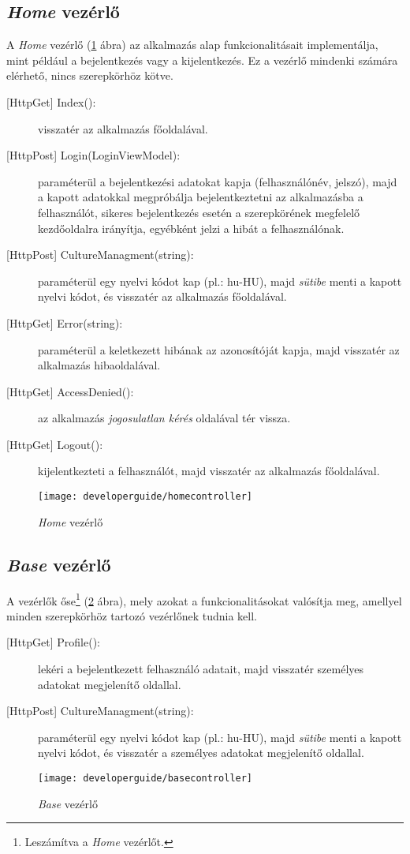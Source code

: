 \subsection{\emph{Home} vezérlő}
A \emph{Home} vezérlő (\ref{fig:homecontroller} ábra) az alkalmazás alap funkcionalitásait implementálja, mint például a bejelentkezés vagy a kijelentkezés. Ez a vezérlő mindenki számára elérhető, nincs szerepkörhöz kötve.
\begin{description}
	\item[{[HttpGet]} Index():] visszatér az alkalmazás főoldalával.
	\item[{[HttpPost]} Login(LoginViewModel):] paraméterül a bejelentkezési adatokat kapja (felhasználónév, jelszó), majd a kapott adatokkal megpróbálja bejelentkeztetni az alkalmazásba a felhasználót, sikeres bejelentkezés esetén a szerepkörének megfelelő kezdőoldalra irányítja, egyébként jelzi a hibát a felhasználónak.
	\item[{[HttpPost]} CultureManagment(string):] paraméterül egy nyelvi kódot kap (pl.: hu-HU), majd \emph{sütibe} menti a kapott nyelvi kódot, és visszatér az alkalmazás főoldalával. 
	\item[{[HttpGet]} Error(string):] paraméterül a keletkezett hibának az azonosítóját kapja, majd visszatér az alkalmazás hibaoldalával.
	\item[{[HttpGet]} AccessDenied():] az alkalmazás \emph{jogosulatlan kérés} oldalával tér vissza.
	\item[{[HttpGet]} Logout():] kijelentkezteti a felhasználót, majd visszatér az alkalmazás főoldalával.
\end{description}
\begin{figure}[H]
	\centering
	\texttt{[image: developerguide/homecontroller]}
	\caption{\emph{Home} vezérlő}
	\label{fig:homecontroller}
\end{figure}
\subsection{\emph{Base} vezérlő}
A vezérlők őse\footnote{Leszámítva a \emph{Home} vezérlőt.} (\ref{fig:basecontroller} ábra), mely azokat a funkcionalitásokat valósítja meg, amellyel minden szerepkörhöz tartozó vezérlőnek tudnia kell.
\begin{description}
	\item[{[HttpGet]} Profile():] lekéri a bejelentkezett felhasználó adatait, majd visszatér személyes adatokat megjelenítő oldallal.
	\item[{[HttpPost]} CultureManagment(string):] paraméterül egy nyelvi kódot kap (pl.: hu-HU), majd \emph{sütibe} menti a kapott nyelvi kódot, és visszatér a személyes adatokat megjelenítő oldallal. 
\end{description}
\begin{figure}[H]
	\centering
	\texttt{[image: developerguide/basecontroller]}
	\caption{\emph{Base} vezérlő}
	\label{fig:basecontroller}
\end{figure}
